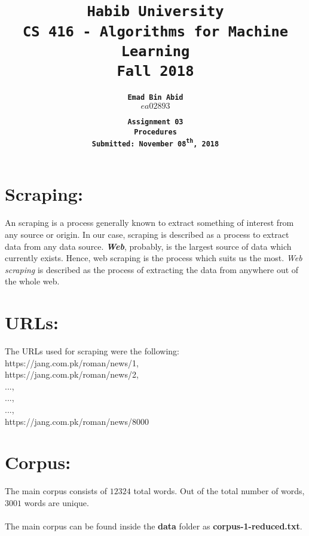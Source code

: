 \documentclass{exam}
\title{\textbf{\tt Habib University}\\ \textbf{\tt CS 416 - Algorithms for Machine Learning}\\ \textbf{\tt Fall 2018}}
\author{\textbf{\tt Emad Bin Abid}\\ {\tt $ea02893$}}
\date{\textbf{\tt Assignment 03}\\ \textbf{\tt Procedures} \\\textbf{\tt Submitted: November 08\textsuperscript{th}, 2018}}
\begin{document}
\maketitle

\section*{Scraping:}
An scraping is a process generally known to extract something of interest from any source or origin. In our case, scraping is described as a process to extract data from any data source. \textbf{\textit{Web}}, probably, is the largest source of data which currently exists. Hence, web scraping is the process which suits us the most. \textit{Web scraping} is described as the process of extracting the data from anywhere out of the whole web. \\

\section*{URLs:}
The URLs used for scraping were the following:\\
https://jang.com.pk/roman/news/1, \\https://jang.com.pk/roman/news/2,\\ ..., \\ ..., \\ ..., \\https://jang.com.pk/roman/news/8000

\section*{Corpus:}
The main corpus consists of $12324$ total words. Out of the total number of words, $3001$ words are unique.\\ \\
The main corpus can be found inside the \textbf{data} folder as \textbf{corpus-1-reduced.txt}.

\pagebreak
\end{document}
